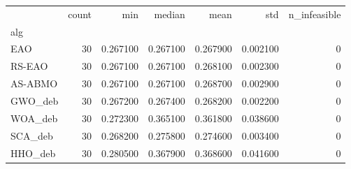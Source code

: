 \begin{tabular}{lrrrrrr}
\toprule
 & count & min & median & mean & std & n_infeasible \\
alg &  &  &  &  &  &  \\
\midrule
EAO & 30 & 0.267100 & 0.267100 & 0.267900 & 0.002100 & 0 \\
RS-EAO & 30 & 0.267100 & 0.267100 & 0.268100 & 0.002300 & 0 \\
AS-ABMO & 30 & 0.267100 & 0.267100 & 0.268700 & 0.002900 & 0 \\
GWO_deb & 30 & 0.267200 & 0.267400 & 0.268200 & 0.002200 & 0 \\
WOA_deb & 30 & 0.272300 & 0.365100 & 0.361800 & 0.038600 & 0 \\
SCA_deb & 30 & 0.268200 & 0.275800 & 0.274600 & 0.003400 & 0 \\
HHO_deb & 30 & 0.280500 & 0.367900 & 0.368600 & 0.041600 & 0 \\
\bottomrule
\end{tabular}
